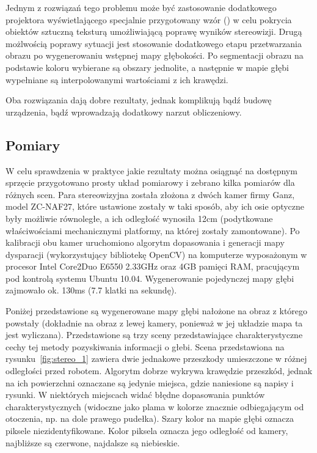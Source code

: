 Jednym z rozwiązań tego problemu może być zastosowanie dodatkowego projektora
wyświetlającego specjalnie przygotowany wzór (\cite{konolige-icra-2010-a}) w celu
pokrycia obiektów sztuczną teksturą umożliwiającą poprawę wyników stereowizji.
Drugą możlwością poprawy sytuacji jest stosowanie dodatkowego etapu przetwarzania
obrazu po wygenerowaniu wstępnej mapy głębokości. Po segmentacji obrazu na podstawie
koloru wybierane są obszary jednolite, a następnie w mapie głębi wypełniane są
interpolowanymi wartościami z ich krawędzi.

Oba rozwiązania dają dobre rezultaty, jednak komplikują bądź budowę urządzenia,
bądź wprowadzają dodatkowy narzut obliczeniowy.

\subsection{Pomiary}

W celu sprawdzenia w praktyce jakie rezultaty można osiągnąć na dostępnym sprzęcie
przygotowano prosty układ pomiarowy i zebrano kilka pomiarów dla różnych scen.
Para stereowizyjna została złożona z dwóch kamer firmy Ganz, model ZC-NAF27, które
ustawione zostały w taki sposób, aby ich osie optyczne były możliwie równoległe,
a ich odległość wynosiła 12cm (podytkowane właściwościami mechanicznymi platformy,
na której zostały zamontowane). Po kalibracji obu kamer uruchomiono algorytm
dopasowania i generacji mapy dysparacji (wykorzystujący bibliotekę OpenCV) na
komputerze wyposażonym w procesor Intel Core2Duo E6550 2.33GHz oraz 4GB pamięci
RAM, pracującym pod kontrolą systemu Ubuntu 10.04. Wygenerowanie pojedynczej mapy
głębi zajmowało ok. 130ms (7.7 klatki na sekundę).

Poniżej przedstawione są wygenerowane mapy głębi nałożone na obraz z którego powstały
(dokładnie na obraz z lewej kamery, ponieważ w jej układzie mapa ta jest wyliczana).
Przedstawione są trzy sceny przedstawiające charakterystyczne cechy tej metody
pozyskiwania informacji o głebi. Scena przedstawiona na rysunku~\ref{fig:stereo_1}
zawiera dwie jednakowe przeszkody umieszczone w różnej odległości przed robotem.
Algorytm dobrze wykrywa krawędzie przeszkód, jednak na ich powierzchni oznaczane
są jedynie miejsca, gdzie naniesione są napisy i rysunki. W niektórych miejscach
widać błędne dopasowania punktów charakterystycznych (widoczne jako plama w kolorze
znacznie odbiegającym od otoczenia, np. na dole prawego pudełka). Szary kolor na
mapie głębi oznacza piksele niezidentyfikowane. Kolor piksela oznacza jego odległość
od kamery, najbliższe są czerwone, najdalsze są niebieskie.

